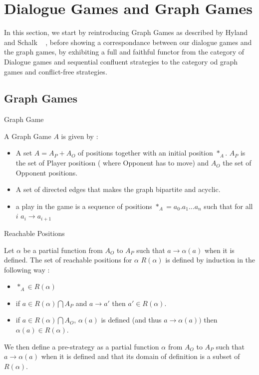 \documentclass[a4paper,UKenglish]{lipics}
\begin{document}
\section{Dialogue Games and Graph Games}
In this section, we start by reintroducing Graph Games as described by Hyland and Schalk ~\cite{} , before showing a correspondance between our dialogue games and the graph games, by exhibiting a full and faithful functor from the category of Dialogue games and sequential confluent strategies to the category od graph games and conflict-free strategies.\\


\subsection{Graph Games}
\begin{definition}{Graph Game}

A Graph Game $A$ is given by :
\begin{itemize}
\item A set $A = A_P + A_O$ of positions together with an initial position $*_A$. $A_P$ is the set of Player positiosn ( where Opponent has to move) and $A_O$ the set of Opponent positions.
\item A set of directed edges that makes the graph bipartite and  acyclic.
\item a play in the game is a sequence of positions $*_A=a_0.a_1...a_n$ such that for all $i$ $a_i \rightarrow a_{i+1}$
\end{itemize}
\end{definition}

\begin{definition}{Reachable Positions}

Let $\alpha$ be a partial function from $A_O$ to $A_P$ such that $a\rightarrow \alpha(a)$ when it is defined. The set of reachable positions for $\alpha$ $R(\alpha)$ is defined by induction in the following way : 
\begin{itemize}
\item $*_A \in R(\alpha)$
\item if $a \in R(\alpha)\bigcap A_P$ and $a\rightarrow a'$ then $a'\in R(\alpha)$. 
\item if $a \in R(\alpha)\bigcap A_O$, $\alpha(a)$ is defined (and thus $a\rightarrow \alpha(a)) $ then $\alpha(a)\in R(\alpha)$.
\end{itemize}
 
We then define a pre-strategy as a partial function $\alpha$ from $A_O$ to $A_P$ such that $a\rightarrow \alpha(a)$ when it is defined and that its domain of definition is a subset of $R(\alpha)$.
\end{definition}
\end{document}
